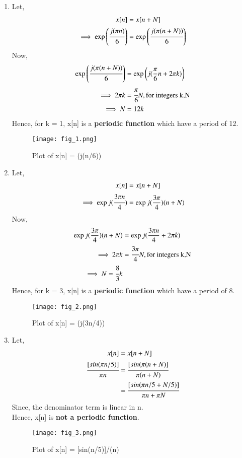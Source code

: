\documentclass[journal,12pt,twocolumn]{IEEEtran}
\begin{document}
\begin{enumerate}
    \item Let,
    \begin{align}
        x[n] &= x[n+N]\\
        \implies \exp{\left(\cfrac{j(\pi n)}{6}\right)} &= \exp{\left(\cfrac{j(\pi (n+N))}{6}\right)}
    \end{align}
Now,
\begin{align}
  \exp{\left(\cfrac{j(\pi (n+N))}{6}\right)} &= \exp{\left(j(\frac{\pi}{6}n + 2\pi k)\right)}\\
  \implies 2\pi k &= \cfrac{\pi}{6}N,\text{for integers k,N}\\
  \implies N &= 12k
\end{align}
Hence, for k = 1, x[n] is a \textbf{periodic function} which have a period of 12.\\
\begin{figure}[!ht]
\centering
\texttt{[image: fig\_1.png]}
\caption{Plot of x[n] = \exp(j(\pi n/6)) }
\end{figure}
\item
Let,
\begin{align}
    x[n] &= x[n+N]\\
    \implies \exp{j(\cfrac{3\pi n}{4})} &= \exp{j(\frac{3\pi}{4})(n+N)}
\end{align}
Now,
\begin{align}
    \exp{j(\frac{3\pi}{4})(n+N)} &= \exp{j(\frac{3\pi n}{4}+2\pi k)}\\
    \implies 2\pi k &= \cfrac{3\pi}{4}N,\text{for integers k,N}\\
    \implies N = \cfrac{8}{3}k
\end{align}
Hence, for k = 3, x[n] is a \textbf{periodic function} which have a period of 8.\\
\begin{figure}[!ht]
\centering
\texttt{[image: fig\_2.png]}
\caption{Plot of x[n] = \exp(j(3\pi n/4)) }
\end{figure}
\item
Let,
\begin{align}
    x[n] &= x[n+N]\\
    \cfrac{[sin(\pi n/5)]}{\pi n} &= \cfrac{[sin(\pi(n+N)]}{\pi(n+N)}\\
                                 &= \cfrac{[sin(\pi n/5 + N/5)]}{\pi n + \pi N}
\end{align}
Since, the denominator term is linear in n.\\
Hence, x[n] is \textbf{not a periodic function}. \\
\begin{figure}[!ht]
\centering
\texttt{[image: fig\_3.png]}
\caption{Plot of x[n] = [sin(\pi n/5)]/(\pi n)}
\end{figure}
    
\end{enumerate}
\end{document}
